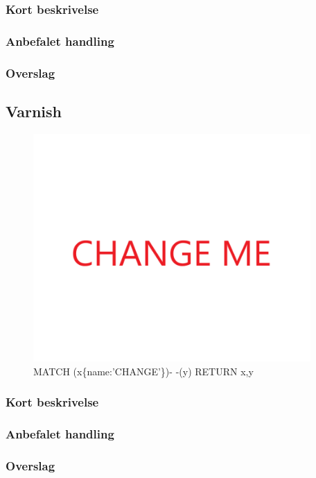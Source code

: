 \documentclass{article}
\begin{document}
\subsubsection{Kort beskrivelse}
\subsubsection{Anbefalet handling}
\subsubsection{Overslag}


\subsection{Varnish}
\begin{figure}[h]
\includegraphics[width=300pt]{CHANGE.PNG}
\caption{MATCH (x\{name:'CHANGE'\})- -(y) RETURN x,y}
\end{figure}
\subsubsection{Kort beskrivelse}
\subsubsection{Anbefalet handling}
\subsubsection{Overslag}
\end{document}
